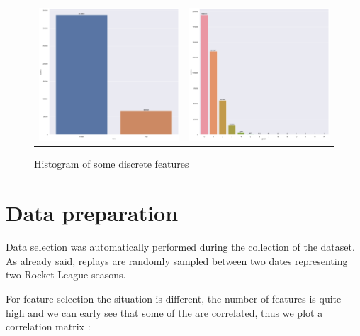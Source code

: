 \begin{figure}[H]
\begin{tabular}{cc}
        \includegraphics[width=0.5\linewidth]{res/imgs/plots/mvp.png} &
        \includegraphics[width=0.5\linewidth]{res/imgs/plots/goals.png} \\
    \end{tabular}
    \caption{Histogram of some discrete features}
    \label{fig:cat_features}
\end{figure}

\section{Data preparation}

Data selection was automatically performed during the collection of the dataset. As already said, replays are randomly sampled between two dates representing two Rocket League seasons.

For feature selection the situation is different, the number of features is quite high and we can early see that some of the are correlated, thus we plot a correlation matrix :

